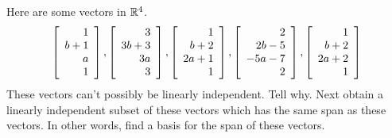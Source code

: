 \begin{enumialphparenastyle}
\begin{ex} Here are some vectors in $\mathbb{R}^{4}$. 
\begin{equation*}
\left[ 
\begin{array}{r}
1 \\ 
b+1 \\ 
a \\ 
1
\end{array}
\right] ,\left[ 
\begin{array}{r}
3 \\ 
3b+3 \\ 
3a \\ 
3
\end{array}
\right] ,\left[ 
\begin{array}{r}
1 \\ 
b+2 \\ 
2a+1 \\ 
1
\end{array}
\right] ,\left[ 
\begin{array}{r}
2 \\ 
2b-5 \\ 
-5a-7 \\ 
2
\end{array}
\right] ,\left[ 
\begin{array}{r}
1 \\ 
b+2 \\ 
2a+2 \\ 
1
\end{array}
\right]
\end{equation*}
These vectors can't possibly be linearly independent. Tell why. Next obtain a
linearly independent subset of these vectors which has the same span as
these vectors. In other words, find a basis for the span of these vectors.
\end{ex}

\end{enumialphparenastyle}